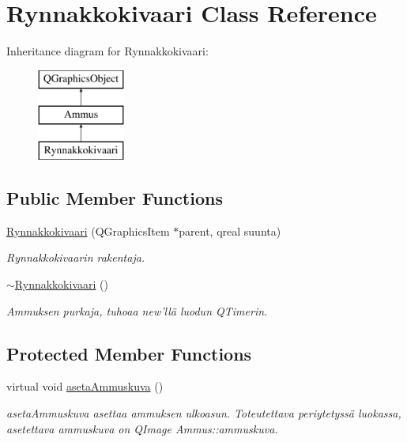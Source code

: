 \hypertarget{class_rynnakkokivaari}{\section{Rynnakkokivaari Class Reference}
\label{class_rynnakkokivaari}
}
Inheritance diagram for Rynnakkokivaari\-:\begin{figure}[H]
\begin{center}
\leavevmode
\includegraphics[height=3.000000cm]{class_rynnakkokivaari}
\end{center}
\end{figure}
\subsection*{Public Member Functions}
\begin{DoxyCompactItemize}
\item 
\hyperlink{class_rynnakkokivaari_ad021e0c4cb3b5fb47e98290b279aaec9}{Rynnakkokivaari} (Q\-Graphics\-Item $\ast$parent, qreal suunta)
\begin{DoxyCompactList}\small\item\em Rynnakkokivaarin rakentaja. \end{DoxyCompactList}\item 
\hyperlink{class_rynnakkokivaari_a9f012122077ef373f64c791c89fab206}{$\sim$\-Rynnakkokivaari} ()
\begin{DoxyCompactList}\small\item\em Ammuksen purkaja, tuhoaa new'llä luodun Q\-Timerin. \end{DoxyCompactList}\end{DoxyCompactItemize}
\subsection*{Protected Member Functions}
\begin{DoxyCompactItemize}
\item 
virtual void \hyperlink{class_rynnakkokivaari_a3b09e5434760dd51d7aeb5834520e52d}{aseta\-Ammuskuva} ()
\begin{DoxyCompactList}\small\item\em aseta\-Ammuskuva asettaa ammuksen ulkoasun. Toteutettava periytetyssä luokassa, asetettava ammuskuva on Q\-Image Ammus\-::ammuskuva. \end{DoxyCompactList}\end{DoxyCompactItemize}
